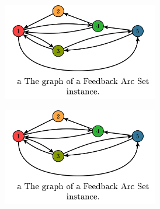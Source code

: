 \documentclass[seminar,german]{algothesis}
\begin{document}
\begin{figure}
	\centering
	\begin{subfigure}{.5\textwidth}
		\includegraphics[width=0.75\textwidth]{graph}
    \end{subfigure}%
    \begin{subfigure}{.5\textwidth}
		\includegraphics[width=0.75\textwidth]{graph}
    \end{subfigure}
\end{figure}
\end{document}
